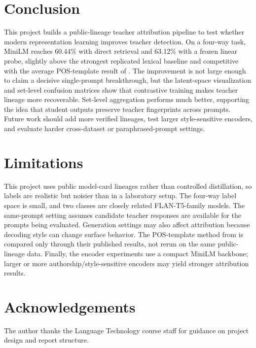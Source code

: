 \documentclass[11pt]{article}
\begin{document}
\section{Conclusion}

This project builds a public-lineage teacher attribution pipeline to test whether modern representation learning improves teacher detection.
On a four-way task, MiniLM reaches 60.44\% with direct retrieval and 63.12\% with a frozen linear probe, slightly above the strongest replicated lexical baseline and competitive with the average POS-template result of \citet{wadhwa-etal-2025-taught}.
The improvement is not large enough to claim a decisive single-prompt breakthrough, but the latent-space visualization and set-level confusion matrices show that contrastive training makes teacher lineage more recoverable.
Set-level aggregation performs much better, supporting the idea that student outputs preserve teacher fingerprints across prompts.
Future work should add more verified lineages, test larger style-sensitive encoders, and evaluate harder cross-dataset or paraphrased-prompt settings.

\section*{Limitations}

This project uses public model-card lineages rather than controlled distillation, so labels are realistic but noisier than in a laboratory setup.
The four-way label space is small, and two classes are closely related FLAN-T5-family models.
The same-prompt setting assumes candidate teacher responses are available for the prompts being evaluated.
Generation settings may also affect attribution because decoding style can change surface behavior.
The POS-template method from \citet{wadhwa-etal-2025-taught} is compared only through their published results, not rerun on the same public-lineage data.
Finally, the encoder experiments use a compact MiniLM backbone; larger or more authorship/style-sensitive encoders may yield stronger attribution results.

\section*{Acknowledgements}

The author thanks the Language Technology course staff for guidance on project design and report structure.


\end{document}
